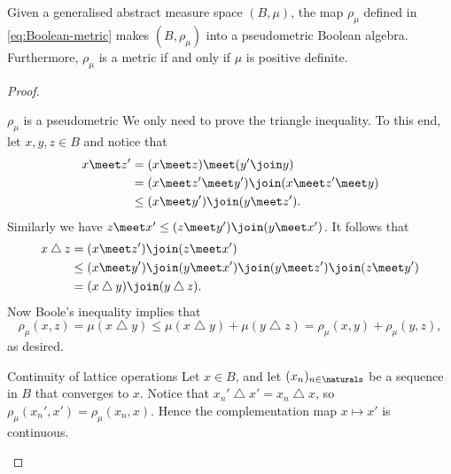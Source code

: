 \documentclass[article, a4paper, 11pt, oneside]{memoir}
\numberwithin{equation}{chapter}
\renewcommand{\symdiff}{\mathbin{\triangle}}
\begin{document}
\begin{proposition}
    Given a generalised abstract measure space $(B,\mu)$, the map $\rho_\mu$ defined in \eqref{eq:Boolean-metric} makes $(B,\rho_\mu)$ into a pseudometric Boolean algebra. Furthermore, $\rho_\mu$ is a metric if and only if $\mu$ is positive definite.
\end{proposition}

\newcommand{\mylistlabelfont}[1]{{\normalfont\color{linkcolor}\textit{#1}:}}

\begin{proof}
\begin{proofsec}
    \item[$\rho_\mu$ is a pseudometric]
    We only need to prove the triangle inequality. To this end, let $x,y,z \in B$ and notice that
    \begin{align*}
        x \meet z'
            &= (x \meet z) \meet (y' \join y) \\
            &= (x \meet z' \meet y') \join (x \meet z' \meet y) \\
            &\leq (x \meet y') \join (y \meet z').
    \end{align*}
    Similarly we have $z \meet x' \leq (z \meet y') \join (y \meet x')$. It follows that
    \begin{align*}
        x \symdiff z
            &= (x \meet z') \join (z \meet x') \\
            &\leq (x \meet y') \join (y \meet x') \join
                  (y \meet z') \join (z \meet y') \\
            &= (x \symdiff y) \join (y \symdiff z).
    \end{align*}
    Now Boole's inequality implies that
    \begin{equation*}
        \rho_\mu(x,z)
            = \mu(x \symdiff y)
            \leq \mu(x \symdiff y) + \mu(y \symdiff z)
            = \rho_\mu(x,y) + \rho_\mu(y,z),
    \end{equation*}
    as desired.

    \item[Continuity of lattice operations]
    Let $x \in B$, and let $(x_n)_{n\in\naturals}$ be a sequence in $B$ that converges to $x$. Notice that $x_n' \symdiff x' = x_n \symdiff x$, so $\rho_\mu(x_n',x') = \rho_\mu(x_n,x)$. Hence the complementation map $x \mapsto x'$ is continuous.


\end{proofsec}
\end{proof}
\end{document}
